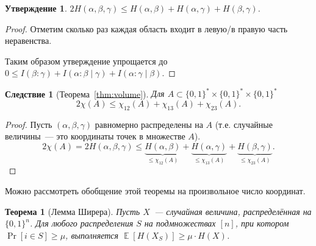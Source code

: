 \documentclass[12pt]{article}
\newcommand{\bits}{\{0,1\}}
\newcommand{\bitstr}{\bits^*}
\DeclareMathOperator*{\E}{\mathbb{E}}
\theoremstyle{definition}
\theoremstyle{plain}
\newtheorem{theorem}{Теорема}[section]
\newtheorem{statement}{Утверждение}[section]
\newtheorem{corollary}{Следствие}[section]
\theoremstyle{remark}
\begin{document}
\begin{statement}
    \(2H(\alpha,\beta,\gamma)\le H(\alpha,\beta) + H(\alpha,\gamma) + H(\beta,\gamma)\).
\end{statement}
\begin{proof}
    Отметим сколько раз каждая область входит в левую/в правую часть неравенства.
    \begin{center}
    \end{center}
Таким образом утверждение упрощается до $0\le I(\beta:\gamma) + I(\alpha:\beta\mid\gamma) +
I(\alpha:\gamma\mid\beta)$.
\end{proof}
\begin{corollary}[Теорема~\ref{thm:volume}]
Для \(A\subset\bitstr\times\bitstr\times\bitstr\)
\[2\chi(A) \le \chi_{12}(A) + \chi_{13}(A) + \chi_{23}(A).\]
\end{corollary}
\begin{proof}
		Пусть $(\alpha,\beta,\gamma)$ равномерно распределены на $A$ (т.е. случайные величины~--- это координаты точек в
		множестве $A$).
    \[
        2\chi(A) = 2H(\alpha,\beta,\gamma)\le 
        \underbrace{H(\alpha,\beta) }_{\le\chi_{12}(A)} + 
        \underbrace{H(\alpha,\gamma)}_{\le\chi_{13}(A)} + 
        \underbrace{H(\beta,\gamma) }_{\le\chi_{23}(A)}.
    \]
\end{proof}
Можно рассмотреть обобщение этой теоремы на произвольное число координат.
\begin{theorem}[Лемма Ширера]
	Пусть $X$~--- случайная величина, распределённая на $\bits^n$.
	Для любого распределения $S$ на подмножествах $[n]$, при котором 
	$\Pr[i\in S]\ge\mu$, выполняется $\E[H(X_S)]\ge \mu\cdot H(X)$.
\end{theorem}
\end{document}

